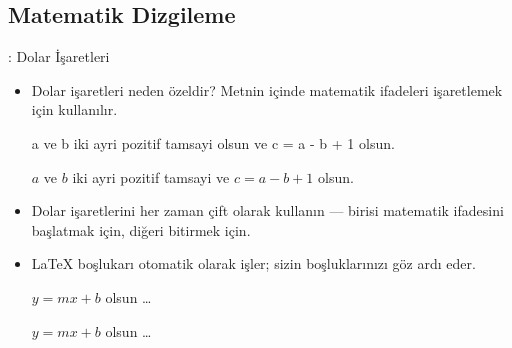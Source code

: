 \documentclass[aspectratio=169]{beamer}
\begin{document}
\subsection{Matematik Dizgileme}
\begin{frame}[fragile]{\insertsubsection{}: Dolar İşaretleri}
\begin{itemize}
\item Dolar işaretleri \keystrokebftt{\$} neden özeldir? Metnin içinde matematik ifadeleri işaretlemek için kullanılır.\\[1ex]
\begin{exampletwouptiny}
a ve b iki ayri pozitif tamsayi olsun
ve c = a - b + 1 olsun.

$a$ ve $b$ iki ayri pozitif tamsayi 
ve $c = a - b + 1$ olsun.
\end{exampletwouptiny}
\item Dolar işaretlerini her zaman çift olarak kullanın --- birisi matematik ifadesini başlatmak için, diğeri bitirmek için.
\item \LaTeX{} boşlukarı otomatik olarak işler; sizin boşluklarınızı göz ardı eder.

\begin{exampletwouptiny}
$y=mx+b$ olsun \ldots

$y = m x + b$ olsun \ldots
\end{exampletwouptiny}
\end{itemize}
\end{frame}
\end{document}
